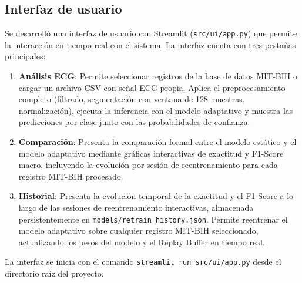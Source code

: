 \subsection{Interfaz de usuario}

Se desarrolló una interfaz de usuario con Streamlit (\texttt{src/ui/app.py}) que permite la interacción en tiempo real con el sistema. La interfaz cuenta con tres pestañas principales:

\begin{enumerate}
\item \textbf{Análisis ECG}: Permite seleccionar registros de la base de datos MIT-BIH o cargar un archivo CSV con señal ECG propia. Aplica el preprocesamiento completo (filtrado, segmentación con ventana de 128 muestras, normalización), ejecuta la inferencia con el modelo adaptativo y muestra las predicciones por clase junto con las probabilidades de confianza.

\item \textbf{Comparación}: Presenta la comparación formal entre el modelo estático y el modelo adaptativo mediante gráficas interactivas de exactitud y F1-Score macro, incluyendo la evolución por sesión de reentrenamiento para cada registro MIT-BIH procesado.

\item \textbf{Historial}: Presenta la evolución temporal de la exactitud y el F1-Score a lo largo de las sesiones de reentrenamiento interactivas, almacenada persistentemente en \texttt{models/retrain\_history.json}. Permite reentrenar el modelo adaptativo sobre cualquier registro MIT-BIH seleccionado, actualizando los pesos del modelo y el Replay Buffer en tiempo real.
\end{enumerate}

La interfaz se inicia con el comando \texttt{streamlit run src/ui/app.py} desde el directorio raíz del proyecto.
